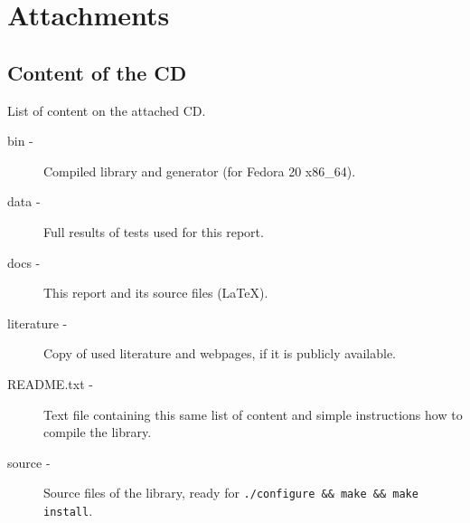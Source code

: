 \chapter{Attachments}\label{chap:attachments}
\section{Content of the CD}
List of content on the attached CD.

\begin{description}
  \item[bin -] Compiled library and generator (for Fedora 20 x86\_64).
  \item[data -] Full results of tests used for this report.
  \item[docs -] This report and its source files (LaTeX).
  \item[literature -] Copy of used literature and webpages, if it is publicly available.
  \item[README.txt -] Text file containing this same list of content and simple instructions how to compile the library.
  \item[source -] Source files of the library, ready for {\tt ./configure \&\& make \&\& make install}.                                         
\end{description}



